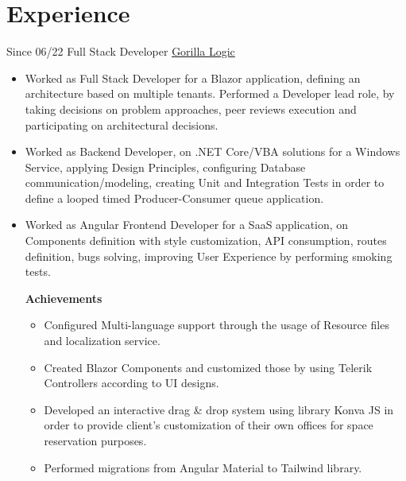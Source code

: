 \documentclass[letterpaper]{twentysecondcv} %
\begin{document}
\section{Experience}
    \begin{twenty}
        \twentyitem
        {Since 06/22}
        {Full Stack Developer}
        { \href{https://gorillalogic.com/}{Gorilla Logic} }
        {
            \begin{itemize}
                \item Worked as Full Stack Developer for a Blazor application, defining an architecture based on multiple tenants. Performed a Developer lead role, by taking decisions on problem approaches, peer reviews execution and participating on architectural decisions.

                \item Worked as Backend Developer, on .NET Core/VBA solutions for a Windows Service, applying Design Principles, configuring Database communication/modeling, creating Unit and Integration Tests in order to define a looped timed Producer-Consumer queue application.
                    
                \item Worked as Angular Frontend Developer for a SaaS application, on Components definition with style customization, API consumption, routes definition, bugs solving, improving User Experience by performing smoking tests.

                \textbf{Achievements}
                \begin{itemize}
                    \item Configured Multi-language support through the usage of Resource files and localization service.
                
                    \item Created Blazor Components and customized those by using Telerik Controllers according to UI designs.
                
                    \item Developed an interactive drag \& drop system using library Konva JS in order to provide client's customization of their own offices for space reservation purposes.

                    \item Performed migrations from Angular Material to Tailwind library.
                \end{itemize}
            

\end{itemize}}
\end{twenty}
\end{document}
